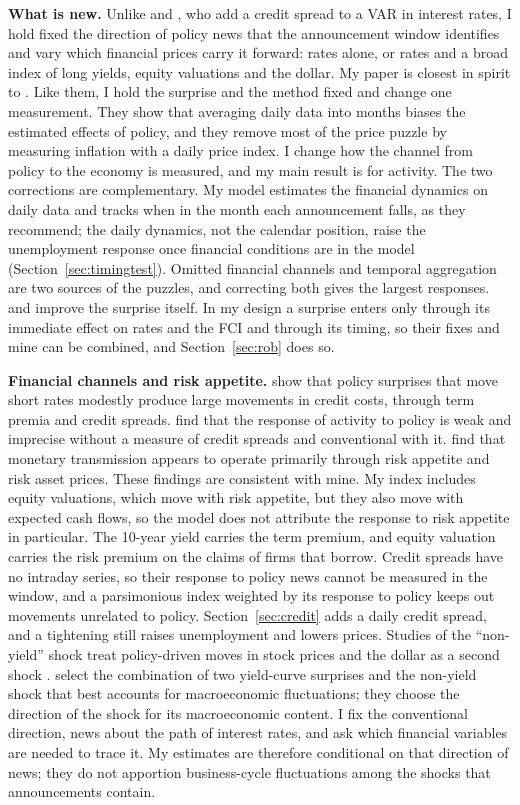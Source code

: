 \documentclass[11pt]{article}
\begin{document}
\textbf{What is new.} Unlike \citet{gertler2015} and \citet{caldara2019}, who add a credit spread to a VAR in interest rates, I hold fixed the direction of policy news that the announcement window identifies and vary which financial prices carry it forward: rates alone, or rates and a broad index of long yields, equity valuations and the dollar. My paper is closest in spirit to \citet{jacobson2026}. Like them, I hold the surprise and the method fixed and change one measurement. They show that averaging daily data into months biases the estimated effects of policy, and they remove most of the price puzzle by measuring inflation with a daily price index. I change how the channel from policy to the economy is measured, and my main result is for activity. The two corrections are complementary. My model estimates the financial dynamics on daily data and tracks when in the month each announcement falls, as they recommend; the daily dynamics, not the calendar position, raise the unemployment response once financial conditions are in the model (Section~\ref{sec:timingtest}). Omitted financial channels and temporal aggregation are two sources of the puzzles, and correcting both gives the largest responses. \citet{bauer2023} and \citet{jarocinski2020} improve the surprise itself. In my design a surprise enters only through its immediate effect on rates and the FCI and through its timing, so their fixes and mine can be combined, and Section~\ref{sec:rob} does so.

\textbf{Financial channels and risk appetite.} \citet{gertler2015} show that policy surprises that move short rates modestly produce large movements in credit costs, through term premia and credit spreads. \citet{caldara2019} find that the response of activity to policy is weak and imprecise without a measure of credit spreads and conventional with it. \citet{bauer2026} find that monetary transmission appears to operate primarily through risk appetite and risk asset prices. These findings are consistent with mine. My index includes equity valuations, which move with risk appetite, but they also move with expected cash flows, so the model does not attribute the response to risk appetite in particular. The 10-year yield carries the term premium, and equity valuation carries the risk premium on the claims of firms that borrow. Credit spreads have no intraday series, so their response to policy news cannot be measured in the window, and a parsimonious index weighted by its response to policy keeps out movements unrelated to policy. Section~\ref{sec:credit} adds a daily credit spread, and a tightening still raises unemployment and lowers prices. Studies of the ``non-yield'' shock treat policy-driven moves in stock prices and the dollar as a second shock \citep{bauer2026,boehm2024}. \citet{boehm2026} select the combination of two yield-curve surprises and the non-yield shock that best accounts for macroeconomic fluctuations; they choose the direction of the shock for its macroeconomic content. I fix the conventional direction, news about the path of interest rates, and ask which financial variables are needed to trace it. My estimates are therefore conditional on that direction of news; they do not apportion business-cycle fluctuations among the shocks that announcements contain.
\end{document}
